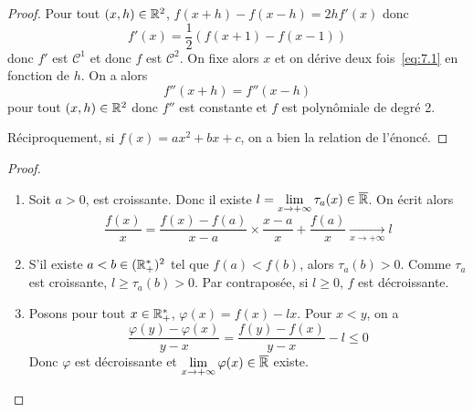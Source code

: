 \documentclass[12pt]{article}
\begin{document}
\begin{proof}
	Pour tout $(x,h)\in\mathbb{R}^{2}$, $f(x+h)-f(x-h)=2hf'(x)$ donc 
	\begin{equation}
		\label{eq:7.1}
		f'(x)=\frac{1}{2}(f(x+1)-f(x-1))
	\end{equation}
	donc $f'$ est $\mathcal{C}^{1}$ et donc $f$ est $\mathcal{C}^{2}$. On fixe alors $x$ et on dérive deux fois~\eqref{eq:7.1} en fonction de $h$. On a alors
	\begin{equation}f''(x+h)=f''(x-h)\end{equation}
	pour tout $(x,h)\in\mathbb{R}^{2}$ donc $f''$ est constante et $f$ est polynômiale de degré 2.

	Réciproquement, si $f(x)=ax^{2}+bx+c$, on a bien la relation de l'énoncé.
\end{proof}

\begin{proof}
	\phantom{}
	\begin{enumerate}
		\item Soit $a>0$, \function{\tau_{a}}{\R}{]a,+\infty[}{x}{\frac{f(x)-f(a)}{x-a}}
		est croissante. Donc il existe $l=\lim\limits_{x\to+\infty}\tau_{a}(x)\in\overline{\mathbb{R}}$. On écrit alors 
		\begin{equation}\frac{f(x)}{x}=\frac{f(x)-f(a)}{x-a}\times \frac{x-a}{x}+\frac{f(a)}{x}\xrightarrow[x\to+\infty]{}l\end{equation}

		\item S'il existe $a<b\in(\mathbb{R}_{+}^{*})^{2}$ tel que $f(a)<f(b)$, alors $\tau_{a}(b)>0$. Comme $\tau_{a}$ est croissante, $l\geqslant\tau_{a}(b)>0$. Par contraposée, si $l\geqslant0$, $f$ est décroissante.
		\item Posons pour tout $x\in\mathbb{R}_{+}^{*}$, $\varphi(x)=f(x)-lx$. Pour $x<y$, on a 
		\begin{equation}\frac{\varphi(y)-\varphi(x)}{y-x}=\frac{f(y)-f(x)}{y-x}-l\leqslant0\end{equation}
		Donc $\varphi$ est décroissante et $\lim\limits_{x\to+\infty}\varphi(x)\in\overline{\mathbb{R}}$ existe.
	\end{enumerate}
\end{proof}
\end{document}
